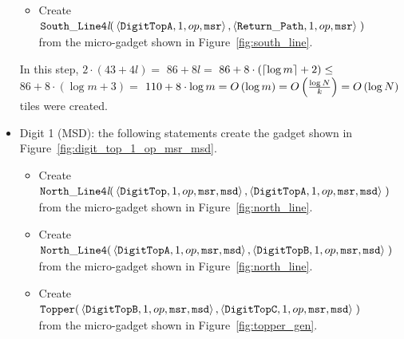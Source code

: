 \begin{itemize}
\begin{itemize}
            \item Create
            $\begin{aligned}[t]
                {\tt South\_Line4\textit{l}}(& \left\langle {\tt DigitTopA}, 1, \inc, {\tt msr}\right\rangle,
                                               \left\langle \returnpath,     1, \inc, {\tt msr}\right\rangle \;)
            \end{aligned}$ \\ from the micro-gadget shown in Figure~\ref{fig:south_line}.
        \end{itemize}
        In this step, $2 \cdot \left( 43 + 4l \right) =$
        $86 + 8l =$
        $86 + 8 \cdot \left( \ceil*{\log m} + 2 \right) \leq$
        $86 + 8 \cdot \left( {\log m} + 3 \right) =$
        $110 + 8 \cdot {\log m} = \bigologm$ tiles were created.
        \vspace{0.5cm}


        \item Digit 1 (MSD): the following statements create the gadget shown in Figure~\ref{fig:digit_top_1_op_msr_msd}.
        \begin{itemize}
            \item Create
            $\begin{aligned}[t]
                {\tt North\_Line4\textit{l}}(& \left\langle {\tt DigitTop},  1, \inc, {\tt msr}, {\tt msd}\right\rangle,
                                               \left\langle {\tt DigitTopA}, 1, \inc, {\tt msr}, {\tt msd}\right\rangle \;)
            \end{aligned}$\\from the micro-gadget shown in Figure~\ref{fig:north_line}.

            \item Create $\begin{aligned}[t]
                {\tt North\_Line4}(& \left\langle {\tt DigitTopA}, 1, \inc, {\tt msr}, {\tt msd}\right\rangle,
                                     \left\langle {\tt DigitTopB}, 1, \inc, {\tt msr}, {\tt msd}\right\rangle \;)
            \end{aligned}$\\from the micro-gadget shown in Figure~\ref{fig:north_line}.

            \item Create $\begin{aligned}[t]
                {\tt Topper}(& \left\langle {\tt DigitTopB}, 1, \inc, {\tt msr}, {\tt msd}\right\rangle,
                               \left\langle {\tt DigitTopC}, 1, \inc, {\tt msr}, {\tt msd}\right\rangle \;)
            \end{aligned}$\\from the micro-gadget shown in Figure~\ref{fig:topper_gen}.


\end{itemize}
\end{itemize}
